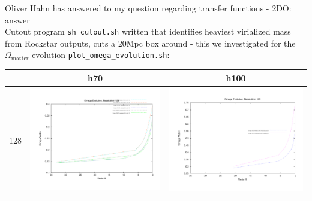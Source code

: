 \documentclass[a4paper,11pt,fleqn,oneside]{book}
\begin{document}
\begin{itemize}
Oliver Hahn has answered to my question regarding transfer functions - 2DO: answer \\
Cutout program \texttt{sh cutout.sh} written that identifies heaviest virialized mass 
from Rockstar outputs, cuts a 20Mpc box around -  this we investigated 
for the $ \Omega_{\text{matter}}$ evolution \texttt{plot\_omega\_evolution.sh}: 

\begin{table}
\begin{tabular}{l|c|c}
 & h70 & h100 \\
\hline 
 128 & \includegraphics[scale=0.2]{analysis/omega_evolution/omega_evolution_128_h70.pdf} & \includegraphics[scale=0.2]{analysis/omega_evolution/omega_evolution_128_h100.pdf} \\

\end{tabular}
\end{table}
\end{itemize}
\end{document}
